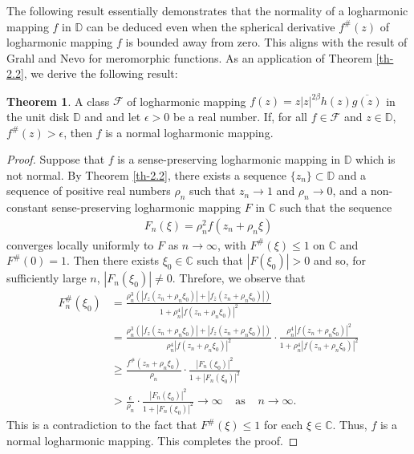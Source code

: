 \documentclass[a4paper,12pt]{amsart}
\theoremstyle{plain}
\theoremstyle{definition}
\newtheorem{thm}{Theorem}[section]
\begin{document}
The following result essentially demonstrates that the normality of a logharmonic mapping $f$ in $\mathbb{D}$ can be deduced even when the spherical derivative $f^{\#}(z)$ of logharmonic mapping $f$ is bounded away from zero. This aligns with the result of Grahl and Nevo \cite[Theorem 1]{Grahl-Nevo-JdMS-2012} for meromorphic functions. As an application of Theorem \ref{th-2.2}, we derive the following result:
\begin{thm}
A class $\mathcal{F}$ of logharmonic mapping $f(z)=z|z|^{2\beta}h(z) \overline{g(z)}$ in the unit disk $\mathbb{D}$ and and let $\epsilon> 0$ be a real number. If, for all $f\in\mathcal{F}$ and $z\in\mathbb{D}$,  $f^{\#}(z)>\epsilon$, then $f$ is a normal logharmonic mapping. 
\end{thm}
\begin{proof}
Suppose that $f$ is a sense-preserving logharmonic mapping in $\mathbb{D}$ which is not normal. By Theorem \ref{th-2.2}, there exists a sequence $\{z_n\}\subset\mathbb{D}$ and a sequence of positive real numbers $\rho_n$ such that $z_n\rightarrow 1$  and $\rho_n\rightarrow 0$, and a non-constant sense-preserving logharmonic mapping $F$ in $\mathbb{C}$ such that
the sequence
\begin{align*}
	F_n(\xi)=\rho^2_n f(z_n+\rho_n\xi)
\end{align*}
converges locally uniformly to $F$ as $n\rightarrow\infty$, with $F^{\#}(\xi)\leq 1$ on $\mathbb{C}$ and $F^{\#}(0)= 1$. Then there exists $\xi_0\in\mathbb{C}$ such that $|F(\xi_0)|>0$ and so, for
sufficiently large $n$, $|F_n(\xi_0)|\neq 0$. Threfore, we observe that
\begin{align*}
	F^{\#}_n(\xi_0)&= \frac{\rho^3_n\left(|f_z(z_n+\rho_n\xi_0)| + |f_{\overline{z}}(z_n+\rho_n\xi_0)|\right)}{1+\rho^4_n |f(z_n+\rho_n\xi_0)|^2}\\&= \frac{\rho^3_n\left(|f_z(z_n+\rho_n\xi_0)| + |f_{\overline{z}}(z_n+\rho_n\xi_0)|\right)}{\rho^4_n |f(z_n+\rho_n\xi_0)|^2}\cdot\frac{\rho^4_n |f(z_n+\rho_n\xi_0)|^2}{1+\rho^4_n |f(z_n+\rho_n\xi_0)|^2} \\&\geq \frac{f^{\#}(z_n+\rho_n\xi_0)}{\rho_n} \cdot\frac{ |F_n(\xi_0)|^2}{1+|F_n(\xi_0)|^2}\\&> \frac{\epsilon}{\rho_n} \cdot\frac{ |F_n(\xi_0)|^2}{1+|F_n(\xi_0)|^2} \rightarrow\infty \;\;\;\;\mbox{as}\;\;\;\;n\rightarrow\infty.
\end{align*}
This is a contradiction to the fact that $F^{\#}(\xi)\leq 1$ for each $\xi\in\mathbb{C}$. Thus, $f$ is a normal logharmonic mapping. This completes the proof.
\end{proof}
\end{document}
